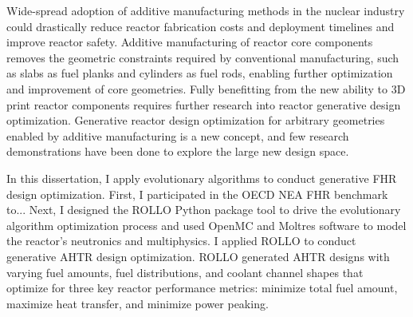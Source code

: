 
Wide-spread adoption of additive manufacturing methods in the nuclear industry 
could drastically reduce reactor fabrication costs and deployment timelines 
and improve reactor safety. 
Additive manufacturing of reactor core components removes the geometric constraints
required by conventional manufacturing, such as slabs as fuel planks and cylinders 
as fuel rods, enabling further optimization and improvement of core geometries. 
Fully benefitting from the new ability to 3D print reactor components requires further 
research into reactor generative design optimization. 
Generative reactor design optimization for arbitrary geometries enabled by additive 
manufacturing is a new concept, and few research demonstrations have been done to 
explore the large new design space. 

In this dissertation, I apply evolutionary algorithms to conduct generative \gls{FHR} 
design optimization. 
First, I participated in the \gls{OECD} \gls{NEA} \gls{FHR} benchmark to...  
Next, I designed the \gls{ROLLO} Python package tool to drive the evolutionary algorithm 
optimization process and used OpenMC and Moltres software to model the reactor's 
neutronics and multiphysics. 
I applied \gls{ROLLO} to conduct generative \gls{AHTR} design optimization.
\gls{ROLLO} generated \gls{AHTR} designs with varying fuel amounts, fuel 
distributions, and coolant channel shapes that optimize for three key reactor 
performance metrics: minimize total fuel amount, maximize heat transfer, and 
minimize power peaking.


